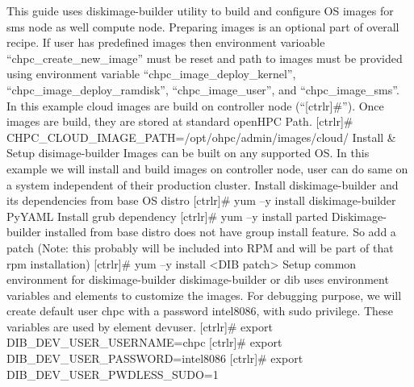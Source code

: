 This guide uses diskimage-builder utility to build and configure OS images for sms node as well compute node.  Preparing images is an optional part of overall recipe. If user has predefined images then environment varioable “chpc_create_new_image” must be reset and path to images must be provided using environment variable “chpc_image_deploy_kernel”, “chpc_image_deploy_ramdisk”, “chpc_image_user”, and “chpc_image_sms”. In this example cloud images are build on controller node (“[ctrlr]#”). Once images are build, they are stored at standard openHPC Path.
[ctrlr]# CHPC_CLOUD_IMAGE_PATH=/opt/ohpc/admin/images/cloud/
Install & Setup disimage-builder
Images can be built on any supported OS. In this example we will install and build images on controller node, user can do same on a system independent of their production cluster. Install diskimage-builder and its dependencies from base OS distro
[ctrlr]# yum –y install diskimage-builder PyYAML
Install grub dependency
[ctrlr]# yum –y install parted
Diskimage-builder installed from base distro does not have group install feature. So add a patch (Note: this probably will be included into RPM and will be part of that rpm installation)
[ctrlr]# yum –y install <DIB patch>
Setup common environment for diskimage-builder
diskimage-builder or dib uses environment variables and elements to customize the images. For debugging purpose, we will create default user chpc with a password intel8086, with sudo privilege. These variables are used by element devuser. 
[ctrlr]# export DIB_DEV_USER_USERNAME=chpc
[ctrlr]# export DIB_DEV_USER_PASSWORD=intel8086
[ctrlr]# export DIB_DEV_USER_PWDLESS_SUDO=1

